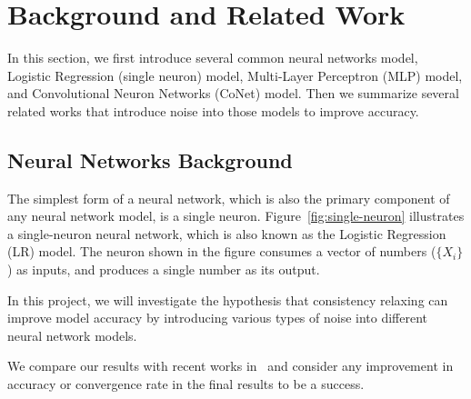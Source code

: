 \section{Background and Related Work}
\label{sec:problem}

In this section, we first introduce several common neural networks model,
Logistic Regression (single neuron) model, Multi-Layer Perceptron (MLP) model,
and Convolutional Neuron Networks (CoNet) model. Then we summarize several
related works that introduce noise into those models to improve accuracy.

\subsection{Neural Networks Background}

The simplest form of a neural network, which is also the primary component of
any neural network model, is a single neuron. Figure~\ref{fig:single-neuron}
illustrates a single-neuron neural network, which is also known as the Logistic
Regression (LR) model. The neuron shown in the figure consumes a vector of
numbers ($\{X_i\}$) as inputs, and produces a single number as its output. 




In this project, we will investigate the hypothesis that consistency
relaxing can improve model accuracy by introducing various types of noise
into different neural network models.

We compare our results with recent works in~\cite{chilimbi14adam,
wan2013dropconnect, goodfellow13maxout, dean2012large} and consider any
improvement in accuracy or convergence rate in the final results to be a
success.


